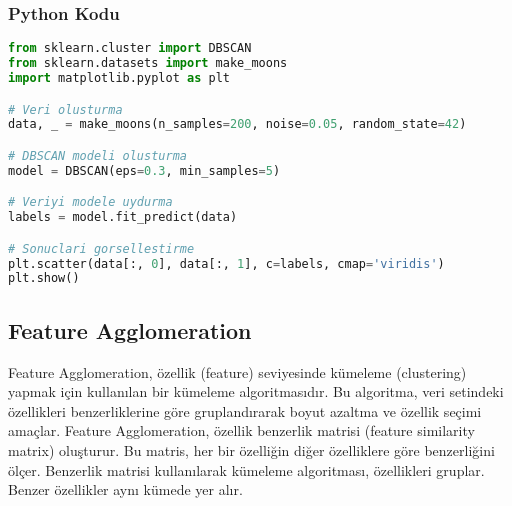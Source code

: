 \begin{table}[h]
\centering
{\scriptsize\renewcommand{\arraystretch}{0.4}
{}}
\end{table}

\subsubsection{Python Kodu}

\begin{lstlisting}[language=Python, caption=Scikit-learn'de DBSCAN.]
from sklearn.cluster import DBSCAN
from sklearn.datasets import make_moons
import matplotlib.pyplot as plt

# Veri olusturma
data, _ = make_moons(n_samples=200, noise=0.05, random_state=42)

# DBSCAN modeli olusturma
model = DBSCAN(eps=0.3, min_samples=5)

# Veriyi modele uydurma
labels = model.fit_predict(data)

# Sonuclari gorsellestirme
plt.scatter(data[:, 0], data[:, 1], c=labels, cmap='viridis')
plt.show()
\end{lstlisting}

\newpage

\subsection{Feature Agglomeration}
Feature Agglomeration, özellik (feature) seviyesinde kümeleme (clustering) yapmak için kullanılan bir kümeleme algoritmasıdır. Bu algoritma, veri setindeki özellikleri benzerliklerine göre gruplandırarak boyut azaltma ve özellik seçimi amaçlar. Feature Agglomeration, özellik benzerlik matrisi (feature similarity matrix) oluşturur. Bu matris, her bir özelliğin diğer özelliklere göre benzerliğini ölçer. Benzerlik matrisi kullanılarak kümeleme algoritması, özellikleri gruplar. Benzer özellikler aynı kümede yer alır.

